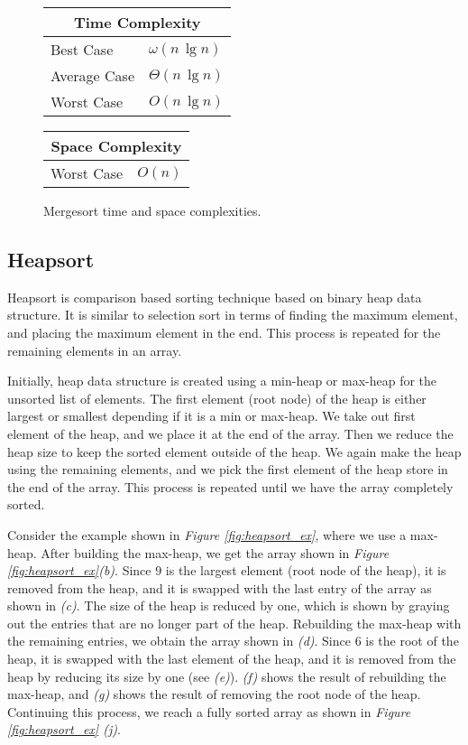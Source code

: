 \begin{figure}[!ht]
    \centering
    \begin{tabular}{l|l}
    \multicolumn{2}{c}{\textbf{Time Complexity}} \\
    \hline
    Best Case    & $\omega(n \, \lg n)$ \\
    Average Case & $\Theta(n \, \lg n)$ \\
    Worst Case   & $O(n \, \lg n)$ \\
    \end{tabular}
    \quad\quad
    \begin{tabular}{l|l}
    \multicolumn{2}{c}{\textbf{Space Complexity}} \\
    \hline
    Worst Case   & $O(n)$
    \end{tabular}
    
    \caption{Mergesort time\cite{clrs2009} and space complexities\cite{big-o}.}
    \label{fig:mergesort}
\end{figure}


\subsection{Heapsort}

Heapsort is comparison based sorting technique based on binary heap data structure. It is similar to selection sort in terms of finding the maximum element, and placing the maximum element in the end. This process is repeated for the remaining elements in an array. 

Initially, heap data structure is created using a min-heap or max-heap for the unsorted list of elements. The first element (root node) of the heap is either largest or smallest depending if it is a min or max-heap. We take out first element of the heap, and we place it at the end of the array. Then we reduce the heap size to keep the sorted element outside of the heap. We again make the heap using the remaining elements, and we pick the first element of the heap store in the end of the array. This process is repeated until we have the array completely sorted. 

Consider the example shown in \textit{Figure \ref{fig:heapsort_ex}}, where we use a max-heap. After building the max-heap, we get the array shown in \textit{Figure \ref{fig:heapsort_ex}(b)}. Since $9$ is the largest element (root node of the heap), it is removed from the heap, and it is swapped with the last entry of the array as shown in \textit{(c)}. The size of the heap is reduced by one, which is shown by graying out the entries that are no longer part of the heap. Rebuilding the max-heap with the remaining entries, we obtain the array shown in \textit{(d)}. Since $6$ is the root of the heap, it is swapped with the last element of the heap, and it is removed from the heap by reducing its size by one (see \textit{(e)}). \textit{(f)} shows the result of rebuilding the max-heap, and \textit{(g)} shows the result of removing the root node of the heap. Continuing this process, we reach a fully sorted array as shown in \textit{Figure \ref{fig:heapsort_ex} (j)}.


